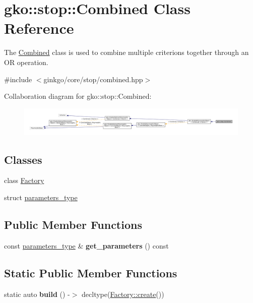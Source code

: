 \hypertarget{classgko_1_1stop_1_1Combined}{}\section{gko\+:\+:stop\+:\+:Combined Class Reference}
\label{classgko_1_1stop_1_1Combined}


The \hyperlink{classgko_1_1stop_1_1Combined}{Combined} class is used to combine multiple criterions together through an OR operation.  




{\ttfamily \#include $<$ginkgo/core/stop/combined.\+hpp$>$}



Collaboration diagram for gko\+:\+:stop\+:\+:Combined\+:
\nopagebreak
\begin{figure}[H]
\begin{center}
\leavevmode
\includegraphics[width=350pt]{classgko_1_1stop_1_1Combined__coll__graph}
\end{center}
\end{figure}
\subsection*{Classes}
\begin{DoxyCompactItemize}
\item 
class \hyperlink{classgko_1_1stop_1_1Combined_1_1Factory}{Factory}
\item 
struct \hyperlink{structgko_1_1stop_1_1Combined_1_1parameters__type}{parameters\+\_\+type}
\end{DoxyCompactItemize}
\subsection*{Public Member Functions}
\begin{DoxyCompactItemize}
\item 
\mbox{\label{classgko_1_1stop_1_1Combined_a0acc22e2dcbbf1493f9acb2fc77dbecd}} 
const \hyperlink{structgko_1_1stop_1_1Combined_1_1parameters__type}{parameters\+\_\+type} \& {\bfseries get\+\_\+parameters} () const
\end{DoxyCompactItemize}
\subsection*{Static Public Member Functions}
\begin{DoxyCompactItemize}
\item 
\mbox{\label{classgko_1_1stop_1_1Combined_a690e4d16114fc725080cdc8826c4ddc0}} 
static auto {\bfseries build} () -\/$>$ decltype(\hyperlink{classgko_1_1EnableDefaultFactory_a1d077101d9e788e6c65f088612d14cc3}{Factory\+::create}())
\end{DoxyCompactItemize}
